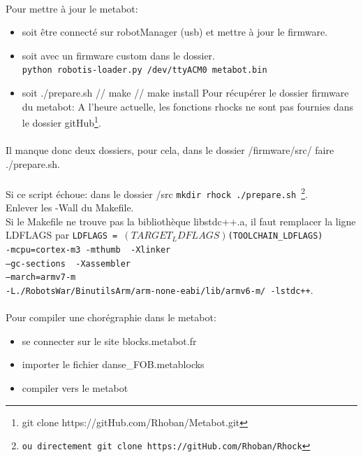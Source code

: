\documentclass[10pt,a4paper]{report}
\begin{document}
\begin{appendices}
\paragraph{}
Pour mettre à jour le metabot:
\begin{itemize}
\item soit être connecté sur robotManager (usb) et mettre à jour le firmware.
\item soit avec un firmware custom dans le dossier.\\
    \texttt{python robotis-loader.py /dev/ttyACM0 metabot.bin}
\item soit ./prepare.sh // make // make install
Pour récupérer le dossier firmware du metabot:
A l'heure actuelle, les fonctions rhocks ne sont pas fournies dans le dossier  gitHub\footnote{git clone https://gitHub.com/Rhoban/Metabot.git}.
\end{itemize}

\paragraph{}
Il manque donc deux dossiers, pour cela, dans le dossier /firmware/src/ faire ./prepare.sh.
\paragraph{}
Si ce script échoue: dans le dossier /src \texttt{mkdir rhock ./prepare.sh \footnote{ou directement git clone https://gitHub.com/Rhoban/Rhock}}. \\
Enlever les -Wall du Makefile.\\
Si le Makefile ne trouve pas la bibliothèque libstdc++.a, il faut remplacer la ligne LDFLAGS par  
\texttt{LDFLAGS = $(TARGET_LDFLAGS) $(TOOLCHAIN\_LDFLAGS)\\ 
-mcpu=cortex-m3 -mthumb \ -Xlinker\\ 
--gc-sections \ -Xassembler\\
--march=armv7-m \ \\
-L./RobotsWar/BinutilsArm/arm-none-eabi/lib/armv6-m/ -lstdc++}.
\paragraph{}
Pour compiler une chorégraphie dans le metabot:
\begin{itemize}
\item se connecter sur le site blocks.metabot.fr
\item importer le fichier danse\_FOB.metablocks
\item compiler vers le metabot
\end{itemize}

\end{appendices}
\end{document}
